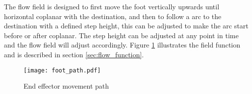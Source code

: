             The flow field is designed to first move the foot vertically upwards until horizontal coplanar with the destination, and then to follow a
            arc to the destination with a defined step height, this can be adjusted to make the arc start before or after coplanar. The step height can be adjusted at any point in time and the flow field will adjust accordingly.
            Figure \ref{fig:foot_arc} illustrates the field function and is described in section \ref{sec:flow_function}.
            \begin{figure}[h]
                \centering
                \hspace{-1.38cm}
                \texttt{[image: foot\_path.pdf]}
                \caption{End effector movement path}
                \label{fig:foot_arc}
            \end{figure}

